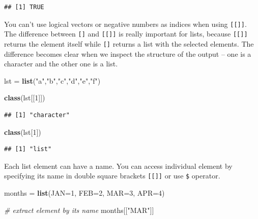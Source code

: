\documentclass[
]{book}
\newenvironment{Shaded}{\begin{snugshade}}{\end{snugshade}}
\newcommand{\CommentTok}[1]{\textcolor[rgb]{0.56,0.35,0.01}{\textit{#1}}}
\newcommand{\DataTypeTok}[1]{\textcolor[rgb]{0.13,0.29,0.53}{#1}}
\newcommand{\DecValTok}[1]{\textcolor[rgb]{0.00,0.00,0.81}{#1}}
\newcommand{\KeywordTok}[1]{\textcolor[rgb]{0.13,0.29,0.53}{\textbf{#1}}}
\newcommand{\NormalTok}[1]{#1}
\newcommand{\StringTok}[1]{\textcolor[rgb]{0.31,0.60,0.02}{#1}}
\begin{document}
\begin{verbatim}
## [1] TRUE
\end{verbatim}

You can't use logical vectors or negative numbers as indices when using \texttt{{[}{[}{]}{]}}. The difference between \texttt{{[}{]}} and \texttt{{[}{[}{]}{]}} is really important for lists, because \texttt{{[}{[}{]}{]}} returns the element itself while \texttt{{[}{]}} returns a list with the selected elements. The difference becomes clear when we inspect the structure of the output -- one is a character and the other one is a list.

\begin{Shaded}
\begin{Highlighting}[]
\NormalTok{lst =}\StringTok{ }\KeywordTok{list}\NormalTok{(}\StringTok{"a"}\NormalTok{,}\StringTok{"b"}\NormalTok{,}\StringTok{"c"}\NormalTok{,}\StringTok{"d"}\NormalTok{,}\StringTok{"e"}\NormalTok{,}\StringTok{"f"}\NormalTok{)}

\KeywordTok{class}\NormalTok{(lst[[}\DecValTok{1}\NormalTok{]])}
\end{Highlighting}
\end{Shaded}

\begin{verbatim}
## [1] "character"
\end{verbatim}

\begin{Shaded}
\begin{Highlighting}[]
\KeywordTok{class}\NormalTok{(lst[}\DecValTok{1}\NormalTok{])}
\end{Highlighting}
\end{Shaded}

\begin{verbatim}
## [1] "list"
\end{verbatim}

Each list element can have a name. You can access individual element by specifying its name in double square brackets \texttt{{[}{[}{]}{]}} or use \texttt{\$} operator.

\begin{Shaded}
\begin{Highlighting}[]
\NormalTok{months =}\StringTok{ }\KeywordTok{list}\NormalTok{(}\DataTypeTok{JAN=}\DecValTok{1}\NormalTok{, }\DataTypeTok{FEB=}\DecValTok{2}\NormalTok{, }\DataTypeTok{MAR=}\DecValTok{3}\NormalTok{, }\DataTypeTok{APR=}\DecValTok{4}\NormalTok{)}

\CommentTok{# extract element by its name}
\NormalTok{months[[}\StringTok{"MAR"}\NormalTok{]]}
\end{Highlighting}
\end{Shaded}
\end{document}
